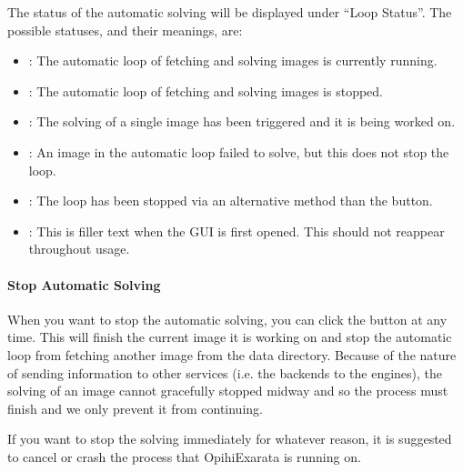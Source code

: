 \documentclass[letterpaper,11pt,english]{sphinxmanual}
\begin{document}
\sphinxAtStartPar
The status of the automatic solving will be displayed under “Loop Status”. The
possible statuses, and their meanings, are:
\begin{itemize}
\item {} 
\sphinxAtStartPar
{}: The automatic loop of fetching and solving images is currently running.

\item {} 
\sphinxAtStartPar
{}: The automatic loop of fetching and solving images is stopped.

\item {} 
\sphinxAtStartPar
{}: The solving of a single image has been triggered and it is being worked on.

\item {} 
\sphinxAtStartPar
{}: An image in the automatic loop failed to solve, but this does not stop the loop.

\item {} 
\sphinxAtStartPar
{}: The loop has been stopped via an alternative method than the  button.

\item {} 
\sphinxAtStartPar
{}: This is filler text when the GUI is first opened. This should not reappear throughout usage.

\end{itemize}


\paragraph{Stop Automatic Solving}
\label{\detokenize{user/automatic_mode:stop-automatic-solving}}
\sphinxAtStartPar
When you want to stop the automatic solving, you can click the  button
at any time. This will finish the current image it is working on and stop the
automatic loop from fetching another image from the data directory. Because of
the nature of sending information to other services (i.e. the backends to the
engines), the solving of an image cannot gracefully stopped mid\sphinxhyphen{}way and so the
process must finish and we only prevent it from continuing.

\sphinxAtStartPar
If you want to stop the solving immediately for whatever reason, it is
suggested to cancel or crash the process that OpihiExarata is running on.
\end{document}
